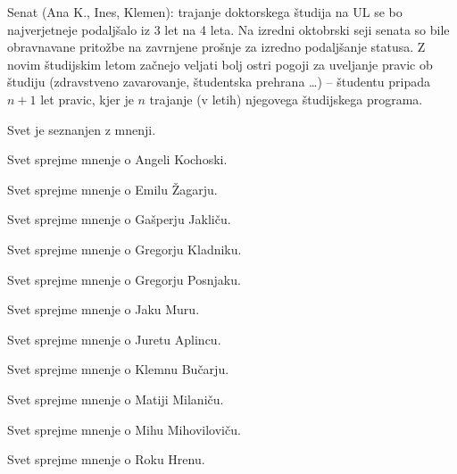 \documentclass{seja}
\begin{document}
\begin{ad}
\item Senat (Ana K., Ines, Klemen): trajanje doktorskega študija na UL se bo
najverjetneje podaljšalo iz 3 let na 4 leta. Na izredni oktobrski seji senata
so bile obravnavane pritožbe na zavrnjene prošnje za izredno podaljšanje
statusa. Z novim študijskim letom začnejo veljati bolj ostri pogoji za
uveljanje pravic ob študiju (zdravstveno zavarovanje, študentska prehrana
\ldots) -- študentu pripada $n+1$ let pravic, kjer je $n$ trajanje (v letih)
njegovega študijskega programa.

\item
Svet je seznanjen z mnenji.

\begin{sklep*}
Svet sprejme mnenje o Angeli Kochoski.
\end{sklep*}
\begin{sklep*}
Svet sprejme mnenje o Emilu Žagarju.
\end{sklep*}
\begin{sklep*}
Svet sprejme mnenje o Gašperju Jakliču.
\end{sklep*}
\begin{sklep*}
Svet sprejme mnenje o Gregorju Kladniku.
\end{sklep*}
\begin{sklep*}
Svet sprejme mnenje o Gregorju Posnjaku.
\end{sklep*}
\begin{sklep*}
Svet sprejme mnenje o Jaku Muru.
\end{sklep*}
\begin{sklep*}
Svet sprejme mnenje o Juretu Aplincu.
\end{sklep*}
\begin{sklep*}
Svet sprejme mnenje o Klemnu Bučarju.
\end{sklep*}
\begin{sklep*}
Svet sprejme mnenje o Matiji Milaniču.
\end{sklep*}
\begin{sklep*}
Svet sprejme mnenje o Mihu Mihoviloviču.
\end{sklep*}
\begin{sklep*}
Svet sprejme mnenje o Roku Hrenu.
\end{sklep*}


\end{ad}
\end{document}
